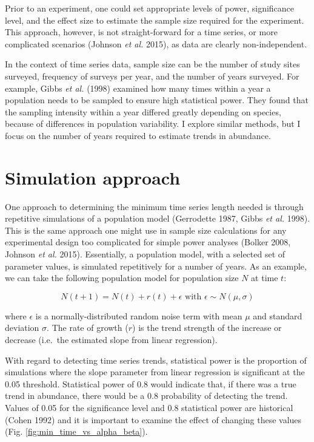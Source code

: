 \documentclass[12pt,]{article}
\begin{document}
Prior to an experiment, one could set appropriate levels of power,
significance level, and the effect size to estimate the sample size
required for the experiment. This approach, however, is not
straight-forward for a time series, or more complicated scenarios
(Johnson \emph{et al.} 2015), as data are clearly non-independent.

In the context of time series data, sample size can be the number of
study sites surveyed, frequency of surveys per year, and the number of
years surveyed. For example, Gibbs \emph{et al.} (1998) examined how
many times within a year a population needs to be sampled to ensure high
statistical power. They found that the sampling intensity within a year
differed greatly depending on species, because of differences in
population variability. I explore similar methods, but I focus on the
number of years required to estimate trends in abundance.

\section{Simulation approach}\label{simulation-approach}

One approach to determining the minimum time series length needed is
through repetitive simulations of a population model (Gerrodette 1987,
Gibbs \emph{et al.} 1998). This is the same approach one might use in
sample size calculations for any experimental design too complicated for
simple power analyses (Bolker 2008, Johnson \emph{et al.} 2015).
Essentially, a population model, with a selected set of parameter
values, is simulated repetitively for a number of years. As an example,
we can take the following population model for population size \(N\) at
time \(t\):

\begin{equation}
N(t + 1) = N(t) + r(t) + \epsilon \mbox{ with } \epsilon \sim N(\mu, \sigma)
\label{sim_model}
\end{equation}

where \(\epsilon\) is a normally-distributed random noise term with mean
\(\mu\) and standard deviation \(\sigma\). The rate of growth (\(r\)) is
the trend strength of the increase or decrease (i.e.~the estimated slope
from linear regression).

With regard to detecting time series trends, statistical power is the
proportion of simulations where the slope parameter from linear
regression is significant at the 0.05 threshold. Statistical power of
0.8 would indicate that, if there was a true trend in abundance, there
would be a 0.8 probability of detecting the trend. Values of 0.05 for
the significance level and 0.8 statistical power are historical (Cohen
1992) and it is important to examine the effect of changing these values
(Fig. \ref{fig:min_time_vs_alpha_beta}).
\end{document}
